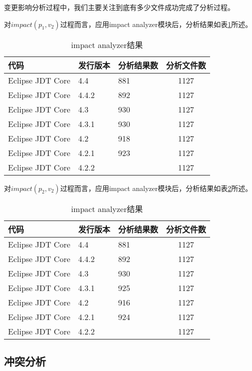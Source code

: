 变更影响分析过程中，我们主要关注到底有多少文件成功完成了分析过程。

对$impact(p_1,v_2)$过程而言，应用impact analyzer模块后，分析结果如表\ref {data_impact_1}所述。

\begin{table}[H]
	\caption{impact analyzer结果}
	\label{data_impact_1}
	\centering
	\begin{tabular}{lllc}
		\toprule[1.5pt]
		{\heiti 代码} & {\heiti 发行版本} & {\heiti 分析结果数} & {\heiti 分析文件数} \\\midrule[1pt]
		Eclipse JDT Core & 4.4	 & 881	& 1127\\
		Eclipse JDT Core & 4.4.2 & 892	& 1127 	\\
		Eclipse JDT Core & 4.3	 & 930	& 1127		\\
		Eclipse JDT Core & 4.3.1 & 930	& 1127 	\\
		Eclipse JDT Core & 4.2 	 &	918 & 1127		\\
		Eclipse JDT Core & 4.2.1 & 923	& 1127	\\
		Eclipse JDT Core & 4.2.2  &	& 1127	\\
		\bottomrule[1.5pt]
	\end{tabular}
\end{table}

对$impact(p_2,v_2)$过程而言，应用impact analyzer模块后，分析结果如表\ref {data_impact_2}所述。

\begin{table}[H]
	\caption{impact analyzer结果}
	\label{data_impact_2}
	\centering
	\begin{tabular}{lllc}
		\toprule[1.5pt]
		{\heiti 代码} & {\heiti 发行版本} & {\heiti 分析结果数} & {\heiti 分析文件数} \\\midrule[1pt]
		Eclipse JDT Core & 4.4	 & 881	& 1127\\
		Eclipse JDT Core & 4.4.2 & 892	& 1127 	\\
		Eclipse JDT Core & 4.3	 & 930	& 1127		\\
		Eclipse JDT Core & 4.3.1 & 925	& 1127 	\\
		Eclipse JDT Core & 4.2 	 & 916	& 1127		\\
		Eclipse JDT Core & 4.2.1 	 & 924	& 1127	\\
		Eclipse JDT Core & 4.2.2 	 &	& 1127	\\
		\bottomrule[1.5pt]
	\end{tabular}
\end{table}


\subsection{冲突分析}

